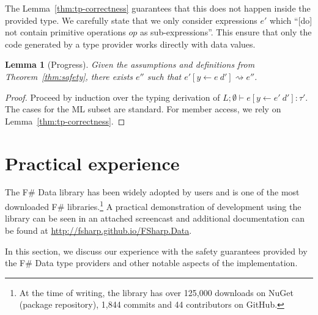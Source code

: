 \documentclass[10pt,nocopyrightspace]{sigplanconf}
\newcommand{\reduce}{\rightsquigarrow}
\newtheorem{lemma}[theorem]{Lemma}
\begin{document}
The Lemma~\ref{thm:tp-correctness} guarantees that this does not happen inside the provided type.
We carefully state that we only consider expressions $e'$ which
``[do] not contain primitive operations $op$ as sub-expressions''. This ensure that only
the code generated by a type provider works directly with data values.

\begin{lemma}[Progress]
\label{thm:rs-progress}
Given the assumptions and definitions from Theorem~\ref{thm:safety}, there exists $e''$ such that
$e'[y\leftarrow e~d'] \reduce e''$.
\end{lemma}
\begin{proof}
Proceed by induction over the typing derivation of $L; \emptyset \vdash e[y\leftarrow e'~d'] : \tau'$.
The cases for the ML subset are standard. For member access, we rely on Lemma~\ref{thm:tp-correctness}.
\end{proof}



%
%

\section{Practical experience}
\label{sec:impl}

The F\# Data library has been widely adopted by users and is one of the most downloaded
F\# libraries.\footnote{At the time of writing, the library has over 125,000 downloads on NuGet
(package repository), 1,844 commits and 44 contributors on GitHub.} A practical demonstration of
development using the library can be seen in an attached screencast and additional documentation can be
found at \url{http://fsharp.github.io/FSharp.Data}.

In this section, we discuss our experience with the safety guarantees provided by the
F\# Data type providers and other notable aspects of the implementation.
\end{document}
